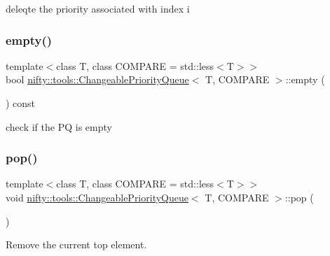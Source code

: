 deleqte the priority associated with index i 

\mbox{\label{classnifty_1_1tools_1_1ChangeablePriorityQueue_a72b99349411452bef664191455f31b30}} 
\subsubsection{\texorpdfstring{empty()}{empty()}}
{\footnotesize\ttfamily template$<$class T, class C\+O\+M\+P\+A\+RE = std\+::less$<$\+T$>$$>$ \\
bool \hyperlink{classnifty_1_1tools_1_1ChangeablePriorityQueue}{nifty\+::tools\+::\+Changeable\+Priority\+Queue}$<$ T, C\+O\+M\+P\+A\+RE $>$\+::empty (\begin{DoxyParamCaption}{ }\end{DoxyParamCaption}) const\hspace{0.3cm}{\ttfamily [inline]}}



check if the PQ is empty 

\mbox{\label{classnifty_1_1tools_1_1ChangeablePriorityQueue_a7c5e4f9f3f2a837a9a1738144c76c17d}} 
\subsubsection{\texorpdfstring{pop()}{pop()}}
{\footnotesize\ttfamily template$<$class T, class C\+O\+M\+P\+A\+RE = std\+::less$<$\+T$>$$>$ \\
void \hyperlink{classnifty_1_1tools_1_1ChangeablePriorityQueue}{nifty\+::tools\+::\+Changeable\+Priority\+Queue}$<$ T, C\+O\+M\+P\+A\+RE $>$\+::pop (\begin{DoxyParamCaption}{ }\end{DoxyParamCaption})\hspace{0.3cm}{\ttfamily [inline]}}



Remove the current top element. 

